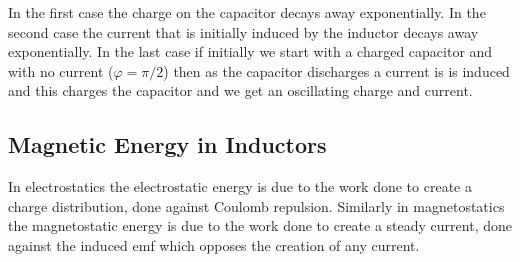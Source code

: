     In the first case the charge on the capacitor decays away exponentially.
    In the second case the current that is initially induced by the inductor decays away exponentially.
    In the last case if initially we start with a charged capacitor and with no current (\(\varphi = \pi/2\)) then as the capacitor discharges a current is is induced and this charges the capacitor and we get an oscillating charge and current.
    
    \subsection{Magnetic Energy in Inductors}\label{sec:energy magnetic field}
    In electrostatics the electrostatic energy is due to the work done to create a charge distribution, done against Coulomb repulsion.
    Similarly in magnetostatics the magnetostatic energy is due to the work done to create a steady current, done against the induced \gls{emf} which opposes the creation of any current.
    
